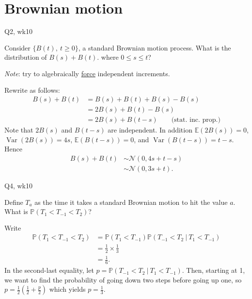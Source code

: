 \section{Brownian motion}

\begin{problem}{Q2, wk10}{}


    Consider $\{B(t), \ t \geq 0\}$, a standard Brownian motion process. What is the distribution of $B(s) + B(t)$. where $0 \leq s \leq t$?

    \tcblower

    \textit{Note}: try to algebraically \underline{force} independent increments.

    Rewrite as follows:
        \begin{align*}
            B(s) + B(t) &= B(s) + B(t) + B(s) - B(s) \\
            &= 2B(s) + B(t) - B(s) \\
            &= 2B(s) + B(t - s) \qquad \text{(stat. inc. prop.)}
        \end{align*}
    Note that $2B(s)$ and $B(t - s)$ are independent. In addition $\mathbb{E}(2B(s)) = 0$, $\operatorname{Var}(2B(s)) = 4s$, $\mathbb{E}(B(t - s)) = 0$, and $\operatorname{Var}(B(t - s)) = t - s$. Hence
        \begin{align*}
            B(s) + B(t) &\sim \mathcal{N}(0, 4s + t - s) \\
            &\sim \mathcal{N}(0, 3s + t) .
        \end{align*}

\end{problem}


\begin{problem}{Q4, wk10}{}


    Define $T_a$ as the time it takes a standard Brownian motion to hit the value $a$. What is $\mathbb{P}(T_1 < T_{-1} < T_2)$?

    \tcblower

    Write
    \begin{align*}
        \mathbb{P}(T_1 < T_{-1} < T_2) &= \mathbb{P}(T_1 < T_{-1}) \mathbb{P}(T_{-1} < T_2 \ \vert \ T_1 < T_{-1}) \\
        &= \frac{1}{2} \times \frac{1}{3}  \\
        &= \frac{1}{6} .
    \end{align*}
    In the second-last equality, let $p = \mathbb{P}(T_{-1} < T_2 \ \vert \ T_1 < T_{-1})$. Then, starting at 1, we want to find the probability of going down two steps before going up one, so $p = \frac{1}{2}(\frac{1}{2} + \frac{p}{2})$ which yields $p = \frac{1}{3}$.

\end{problem}

